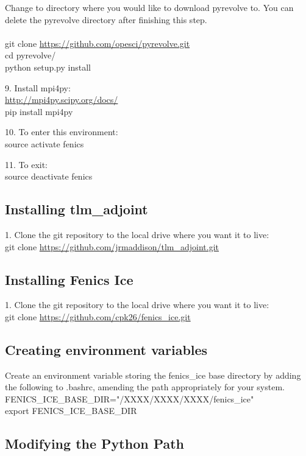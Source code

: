 \documentclass[11pt, reqno, nocenter]{article}
\begin{document}
Change to directory where you would like to download pyrevolve to. You can delete the pyrevolve directory after finishing this step. \\ \\
git clone \url{https://github.com/opesci/pyrevolve.git} \\
cd pyrevolve/ \\
python setup.py install

9. Install mpi4py: \\
\url{http://mpi4py.scipy.org/docs/} \\
pip install mpi4py

10. To enter this environment: \\
source activate fenics

11. To exit: \\
source deactivate fenics

\subsection{Installing tlm\_adjoint}

1. Clone the git repository to the local drive where you want it to live:\\
git clone \url{https://github.com/jrmaddison/tlm_adjoint.git}

\subsection{Installing Fenics Ice}

1. Clone the git repository to the local drive where you want it to live: \\
git clone \url{https://github.com/cpk26/fenics_ice.git}


\subsection{Creating environment variables}
Create an environment variable storing the fenics\_ice base directory by adding the following to .bashrc, amending the path appropriately for your system. \\
FENICS\_ICE\_BASE\_DIR="/XXXX/XXXX/XXXX/fenics\_ice" \\                                            
export FENICS\_ICE\_BASE\_DIR   


\subsection{Modifying the Python Path}
\end{document}
